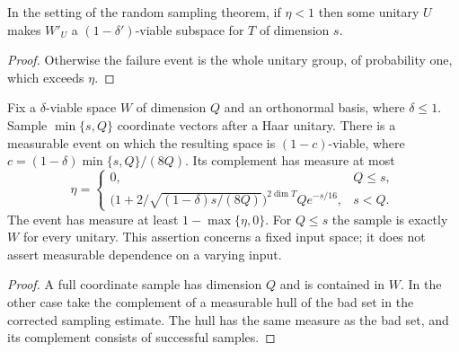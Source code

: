 \begin{theorem}
    \label{thm:viable_random_sampling_exists}
    \leanok
    In the setting of the random sampling theorem, if $\eta<1$ then some
    unitary $U$ makes $W'_U$ a $(1-\delta')$-viable subspace for $T$ of
    dimension $s$.
\end{theorem}

\begin{proof}
    \leanok
    Otherwise the failure event is the whole unitary group, of probability
    one, which exceeds $\eta$.
\end{proof}


\begin{lemma}
    \label{thm:viable_sample_or_full}
    \leanok
    Fix a $\delta$-viable space $W$ of dimension $Q$ and an orthonormal
    basis, where $\delta\le1$. Sample $\min\{s,Q\}$ coordinate vectors
    after a Haar unitary. There is a measurable event on which the
    resulting space is $(1-c)$-viable, where
    $c=(1-\delta)\min\{s,Q\}/(8Q)$.
    Its complement has measure at most
    \[
        \eta=\begin{cases}
            0,          & Q\le s, \\
            \bigl(1+2/\sqrt{(1-\delta)s/(8Q)}\bigr)^{2\dim T}
            Qe^{-s/16}, & s<Q.
        \end{cases}
    \]
    The event has measure at least $1-\max\{\eta,0\}$.
    For $Q\le s$ the sample is exactly $W$ for every unitary.
    This assertion concerns a fixed input space; it does not assert
    measurable dependence on a varying input.
\end{lemma}
\begin{proof}\leanok
    A full coordinate sample has dimension $Q$ and is contained in $W$.
    In the other case take the complement of a measurable hull of the
    bad set in the corrected sampling estimate. The hull has the same
    measure as the bad set, and its complement consists of successful
    samples.
\end{proof}


